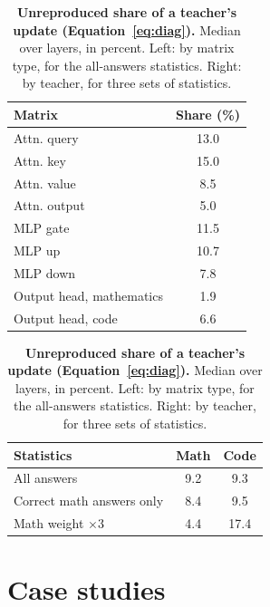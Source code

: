 \begin{table}[t]
\centering\small
\begin{minipage}[t]{0.40\textwidth}
\vspace{0pt}\centering
\setlength{\tabcolsep}{5pt}
\begin{tabular*}{\linewidth}{@{\extracolsep{\fill}}lc@{}}
\toprule
Matrix & Share (\%) \\
\midrule
Attn. query & 13.0 \\
Attn. key & 15.0 \\
Attn. value & 8.5 \\
Attn. output & 5.0 \\
MLP gate & 11.5 \\
MLP up & 10.7 \\
MLP down & 7.8 \\
Output head, mathematics & 1.9 \\
Output head, code & 6.6 \\
\bottomrule
\end{tabular*}
\end{minipage}\hspace{0.06\textwidth}%
\begin{minipage}[t]{0.40\textwidth}
\vspace{0pt}\centering
\setlength{\tabcolsep}{5pt}
\begin{tabular*}{\linewidth}{@{\extracolsep{\fill}}lcc@{}}
\toprule
Statistics & Math & Code \\
\midrule
All answers & 9.2 & 9.3 \\
Correct math answers only & 8.4 & 9.5 \\
Math weight $\times$3 & 4.4 & 17.4 \\
\bottomrule
\end{tabular*}
\end{minipage}
\caption{\textbf{Unreproduced share of a teacher's update
(Equation~\eqref{eq:diag}).} Median over layers, in percent. Left: by matrix
type, for the all-answers statistics. Right: by teacher, for three sets of
statistics.}
\label{tab:eps}
\end{table}

\FloatBarrier
\section{Case studies}
\label{app:cases}

